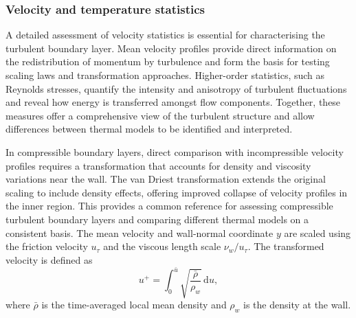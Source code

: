 





\subsubsection{Velocity and temperature statistics}
A detailed assessment of velocity statistics is essential for characterising the turbulent boundary layer. Mean velocity profiles provide direct information on the redistribution of momentum by turbulence and form the basis for testing scaling laws and transformation approaches. Higher-order statistics, such as Reynolds stresses, quantify the intensity and anisotropy of turbulent fluctuations and reveal how energy is transferred amongst flow components. Together, these measures offer a comprehensive view of the turbulent structure and allow differences between thermal models to be identified and interpreted.

In compressible boundary layers, direct comparison with incompressible velocity profiles requires a transformation that accounts for density and viscosity variations near the wall. The van Driest transformation \citep{VanDriest1952} extends the original scaling to include density effects, offering improved collapse of velocity profiles in the inner region. This provides a common reference for assessing compressible turbulent boundary layers and comparing different thermal models on a consistent basis. The mean velocity and wall-normal coordinate $y$ are scaled using the friction velocity $u_{\tau}$ and the viscous length scale $\nu_w/u_{\tau}$. The transformed velocity is defined as
\begin{equation}
    u^{+} = \int_{0}^{\bar{u}} \sqrt{\frac{\bar{\rho}}{\rho_w}} \, \mathrm{d}u ,
\end{equation}
where $\bar{\rho}$ is the time-averaged local mean density and $\rho_w$ is the density at the wall.

